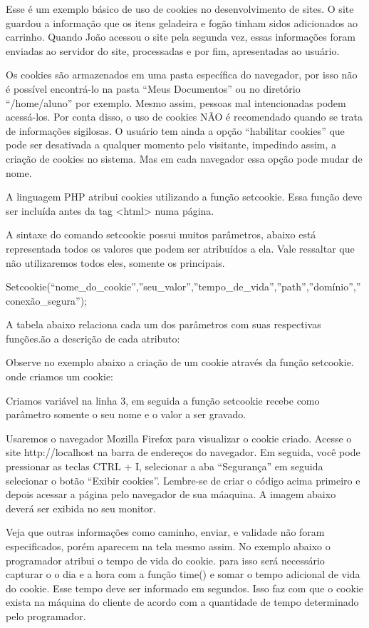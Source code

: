 Esse é um exemplo básico de uso de cookies no desenvolvimento de sites. O site guardou a informação que os itens geladeira e fogão tinham sidos adicionados ao carrinho. Quando João acessou o site pela segunda vez, essas informações foram enviadas ao servidor do site, processadas e por fim, apresentadas ao usuário.

Os cookies são armazenados em uma pasta específica do navegador, por isso não é possível encontrá-lo na pasta “Meus Documentos” ou no diretório “/home/aluno” por exemplo. Mesmo assim, pessoas mal intencionadas podem acessá-los. Por conta disso, o uso de cookies NÃO é recomendado quando se trata de informações sigilosas. O usuário tem ainda a opção “habilitar cookies” que pode ser desativada a qualquer momento pelo visitante, impedindo assim, a criação de cookies no sistema. Mas em cada navegador essa opção pode mudar de nome. 

A linguagem PHP atribui cookies utilizando a função setcookie. Essa função deve ser incluída antes da tag <html> numa página.

A sintaxe do comando setcookie possui muitos parâmetros, abaixo está representada todos os valores que podem ser atribuídos a ela. Vale ressaltar que não utilizaremos todos eles, somente os principais.

Setcookie(“nome_do_cookie”,”seu_valor”,”tempo_de_vida”,”path”,”domínio”,”conexão_segura”);

A tabela abaixo relaciona cada um dos parâmetros com suas respectivas funções.ão a descrição de cada atributo:

Observe no exemplo abaixo a criação de um cookie através da função setcookie. onde criamos um cookie:



Criamos variável na linha 3, em seguida a função setcookie recebe como parâmetro somente o seu nome e o valor a ser gravado.

Usaremos o navegador Mozilla Firefox para visualizar o cookie criado. Acesse o site http://localhost na barra de endereços do navegador. Em seguida, você pode pressionar as teclas CTRL + I, selecionar a aba “Segurança” em seguida selecionar o botão “Exibir cookies”. Lembre-se de criar o código acima primeiro e depois acessar a página pelo navegador de sua máaquina. A imagem abaixo deverá ser exibida no seu monitor.

Veja que outras informações como caminho, enviar, e validade não foram especificados, porém aparecem na tela mesmo assim.
No exemplo abaixo o programador atribui o tempo de vida do cookie. para isso será necessário capturar o o dia e a hora com a função time() e somar o tempo adicional de vida do cookie. Esse tempo deve ser informado em segundos. Isso faz com que o cookie exista na máquina do cliente de acordo com a quantidade de tempo determinado pelo programador.

